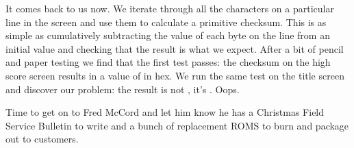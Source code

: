 It comes back to us now. We iterate through all the characters on a particular line in the screen and use them to calculate
a primitive checksum. This is as simple as cumulatively subtracting the value of each byte on the line from an initial value
and checking that the result is what we expect. After a bit of pencil and paper testing we find that the first test passes:
the checksum on the high score screen results in a value of  in hex. We run the same test on the title screen
and discover our problem: the result is not , it's . Oops.

Time to get on to Fred McCord and let him know he has a Christmas Field Service Bulletin to write and a bunch of replacement
ROMS to burn and package out to customers.



